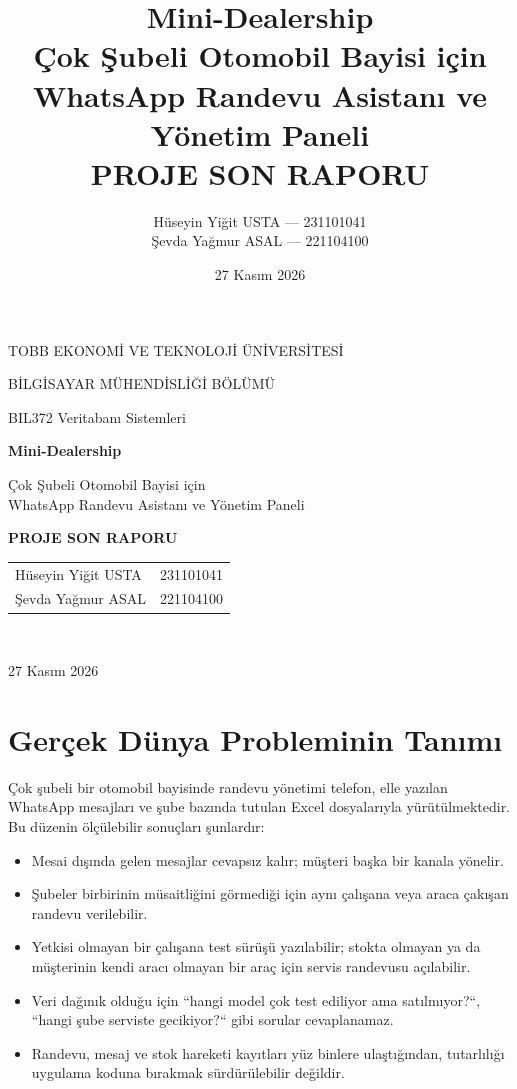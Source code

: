 \documentclass[11pt,a4paper]{article}
\title{Mini-Dealership\\[0.3em]
\large Çok Şubeli Otomobil Bayisi için WhatsApp Randevu Asistanı ve Yönetim Paneli\\[0.6em]
\normalsize PROJE SON RAPORU}
\author{Hüseyin Yiğit USTA --- 231101041\\ Şevda Yağmur ASAL --- 221104100}
\date{27 Kasım 2026}
\begin{document}
\begin{titlepage}
\centering
\vspace*{2.5cm}
{\Large TOBB EKONOMİ VE TEKNOLOJİ ÜNİVERSİTESİ\par}
{\large BİLGİSAYAR MÜHENDİSLİĞİ BÖLÜMÜ\par}
{\large BIL372 Veritabanı Sistemleri\par}
\vspace{2cm}
{\Huge\bfseries Mini-Dealership\par}
\vspace{0.6cm}
{\Large Çok Şubeli Otomobil Bayisi için\\ WhatsApp Randevu Asistanı ve Yönetim Paneli\par}
\vspace{1.2cm}
{\Large\bfseries PROJE SON RAPORU\par}
\vfill
\begin{tabular}{ll}
Hüseyin Yiğit USTA & 231101041\\
Şevda Yağmur ASAL & 221104100\\
\end{tabular}\\[1cm]
{\large 27 Kasım 2026\par}
\end{titlepage}

\tableofcontents
\newpage

\section{Gerçek Dünya Probleminin Tanımı}

Çok şubeli bir otomobil bayisinde randevu yönetimi telefon, elle yazılan WhatsApp
mesajları ve şube bazında tutulan Excel dosyalarıyla yürütülmektedir. Bu düzenin
ölçülebilir sonuçları şunlardır:

\begin{itemize}[leftmargin=1.2em]
  \item Mesai dışında gelen mesajlar cevapsız kalır; müşteri başka bir kanala yönelir.
  \item Şubeler birbirinin müsaitliğini görmediği için aynı çalışana veya araca
        çakışan randevu verilebilir.
  \item Yetkisi olmayan bir çalışana test sürüşü yazılabilir; stokta olmayan ya da
        müşterinin kendi aracı olmayan bir araç için servis randevusu açılabilir.
  \item Veri dağınık olduğu için ``hangi model çok test ediliyor ama satılmıyor?``,
        ``hangi şube serviste gecikiyor?`` gibi sorular cevaplanamaz.
  \item Randevu, mesaj ve stok hareketi kayıtları yüz binlere ulaştığından,
        tutarlılığı uygulama koduna bırakmak sürdürülebilir değildir.
\end{itemize}
\end{document}
